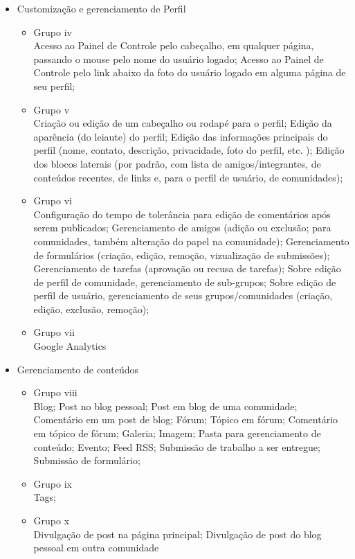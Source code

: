 \begin{itemize}
\item Customização e gerenciamento de Perfil \\
    \begin{itemize}
    \item Grupo iv\\
    Acesso ao Painel de Controle pelo cabeçalho, em qualquer página, passando o mouse pelo nome do usuário logado; Acesso ao Painel de Controle pelo link abaixo da foto do usuário logado em alguma página de seu perfil; 
    \item Grupo v\\
    Criação ou edição de um cabeçalho ou rodapé para o perfil; Edição da aparência (do leiaute) do perfil; Edição das informações principais do perfil (nome, contato, descrição, privacidade, foto do perfil, etc. ); Edição dos blocos laterais (por padrão, com lista de amigos/integrantes, de conteúdos recentes, de links e, para o perfil de usuário, de comunidades); 
    \item Grupo vi\\
Configuração do tempo de tolerância para edição de comentários após serem publicados; Gerenciamento de amigos (adição ou exclusão; para comunidades, também alteração do papel na comunidade); Gerenciamento de formulários (criação, edição, remoção, vizualização de submissões); Gerenciamento de tarefas (aprovação ou recusa de tarefas); Sobre edição de perfil de comunidade, gerenciamento de sub-grupos; Sobre edição de perfil de usuário, gerenciamento de seus grupos/comunidades (criação, edição, exclusão, remoção); 
    \item Grupo vii\\
Google Analytics
    \end{itemize}

\item Gerenciamento de conteúdos \\
    \begin{itemize}
    \item Grupo viii\\
    Blog; Post no blog pessoal; Post em blog de uma comunidade; Comentário em um post de blog; Fórum; Tópico em fórum; Comentário em tópico de fórum; Galeria; Imagem; Pasta para gerenciamento de conteúdo; Evento; Feed RSS; Submissão de trabalho a ser entregue; Submissão de formulário; 
    \item Grupo ix\\
Tags; 
    \item Grupo x\\
Divulgação de post na página principal; Divulgação de post do blog pessoal em outra comunidade
    \end{itemize}


\end{itemize}
